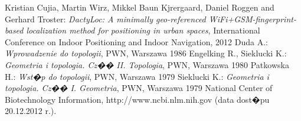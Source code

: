 \begin{thebibliography}{3}                      %
\small              

Kristian Cujia, Martin Wirz, Mikkel Baun Kjrergaard, Daniel Roggen and Gerhard Troster: \emph{DactyLoc: A minimally geo-referenced WiFi+GSM-fingerprint-based localization method for positioning in urban spaces}, International Conference on Indoor Positioning and Indoor Navigation, 2012 
Duda A.: \emph{Wprowadzenie do topologii}, PWN, Warszawa 1986
Engelking R., Sieklucki K.: \emph{Geometria i topologia. Cz�� II. Topologia}, PWN, Warszawa 1980
Patkowska H.: \emph{Wst�p do topologii}, PWN, Warszawa 1979
Sieklucki K.: \emph{Geometria i topologia. Cz�� I. Geometria}, PWN, Warszawa 1979
National Center of Biotechnology Information, http://www.ncbi.nlm.nih.gov (data dost�pu 20.12.2012 r.).
  
\end{thebibliography}                           %